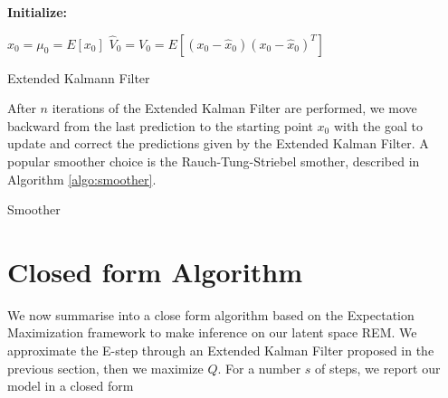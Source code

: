 \documentclass[mscthesis]{usiinfthesis}
\begin{document}

\begin{algorithm}[H]
\textbf{Initialize: }
\begin{substeps}
$\hat{x}_0 = \mu_0 = E[x_0]$ \;
$\hat{V}_0 = V_0 = E[(x_0-\hat{x}_0)(x_0-\hat{x}_0)^T]$  \;
\end{substeps}
  \caption{Extended Kalmann Filter}
  \label{algo:ext_kalmann}
\end{algorithm}

\noindent After $n$ iterations of the Extended Kalman Filter are performed, we move backward from the last prediction to the starting point $x_0$ with the goal to update and correct the predictions given by the Extended Kalman Filter. A popular smoother choice is the Rauch-Tung-Striebel smother, described in Algorithm \ref{algo:smoother}.

\begin{algorithm}[H]
  \caption{Smoother}
  \label{algo:smoother}
\end{algorithm}

\section{Closed form Algorithm}
We now summarise into a close form algorithm based on the Expectation Maximization framework to make inference on our latent space REM. We approximate the E-step through an Extended Kalman Filter proposed in the previous section, then we maximize $Q$. For a number $s$ of steps, we report our model in a closed form
\end{document}
